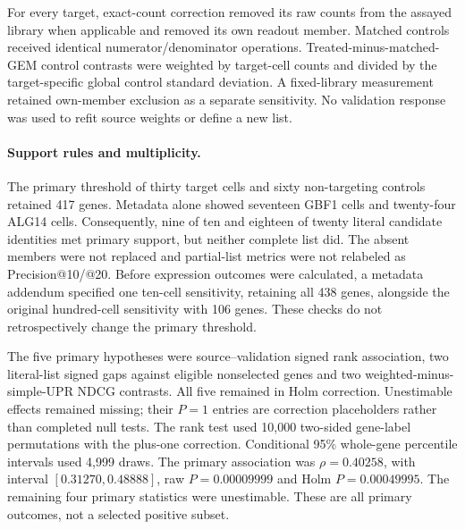 \documentclass[a4paper,fleqn]{cas-sc}
\makeatletter
\DeclareRobustCommand{\rev}[1]{{\color{red}\def\@citecolor{black}\def\@linkcolor{red}\def\@urlcolor{red}#1}}
\makeatother
\begin{document}
\rev{For every target, exact-count correction removed its raw counts from the assayed library when applicable and removed its own readout member.} \rev{Matched controls received identical numerator/denominator operations.} \rev{Treated-minus-matched-GEM control contrasts were weighted by target-cell counts and divided by the target-specific global control standard deviation.} \rev{A fixed-library measurement retained own-member exclusion as a separate sensitivity.} \rev{No validation response was used to refit source weights or define a new list.}

\paragraph{\rev{Support rules and multiplicity.}}
\rev{The primary threshold of thirty target cells and sixty non-targeting controls retained 417 genes.} \rev{Metadata alone showed seventeen GBF1 cells and twenty-four ALG14 cells.} \rev{Consequently, nine of ten and eighteen of twenty literal candidate identities met primary support, but neither complete list did.} \rev{The absent members were not replaced and partial-list metrics were not relabeled as Precision@10/@20.} \rev{Before expression outcomes were calculated, a metadata addendum specified one ten-cell sensitivity, retaining all 438 genes, alongside the original hundred-cell sensitivity with 106 genes.} \rev{These checks do not retrospectively change the primary threshold.}

\rev{The five primary hypotheses were source--validation signed rank association, two literal-list signed gaps against eligible nonselected genes and two weighted-minus-simple-UPR NDCG contrasts.} \rev{All five remained in Holm correction.} \rev{Unestimable effects remained missing; their $P=1$ entries are correction placeholders rather than completed null tests.} \rev{The rank test used 10,000 two-sided gene-label permutations with the plus-one correction.} \rev{Conditional 95\% whole-gene percentile intervals used 4,999 draws.} \rev{The primary association was $\rho=0.40258$, with interval $[0.31270,0.48888]$, raw $P=0.00009999$ and Holm $P=0.00049995$.} \rev{The remaining four primary statistics were unestimable.} \rev{These are all primary outcomes, not a selected positive subset.}
\end{document}
